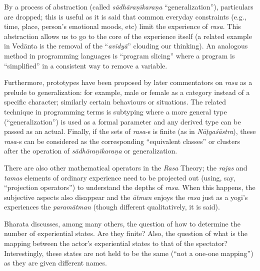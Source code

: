 By a process of abstraction (called \textsl{sādhāraṇīkaraṇa} “generalization”), particulars are dropped; this is useful as it is said that common everyday constraints (e.g., time, place, person’s emotional moods, etc) limit the experience of \textsl{rasa}. This abstraction allows us to go to the core of the experience itself (a related example in Vedānta is the removal of the “\textsl{avidyā}” clouding our thinking). An analogous method in programming languages is “program slicing” where a program is “simplified” in a consistent way to remove a variable. 

Furthermore, prototypes have been proposed by later commentators on \textsl{rasa} as a prelude to generalization: for example, male or female as a category instead of a specific character; similarly certain behaviours or situations. The related technique in programming terms is subtyping where a more general type (“generalization”) is used as a formal parameter and any derived type can be passed as an actual. Finally, if the sets of \textsl{rasa}-s is finite (as in \textsl{Nāṭyaśāstra}), these \textsl{rasa}-s can be considered as the corresponding “equivalent classes” or clusters after the operation of \textsl{sādhāraṇīkaraṇa} or generalization. 

There are also other mathematical operators in the \textsl{Rasa} Theory; the \textsl{rajas} and \textsl{tamas} elements of ordinary experience need to be projected out (using, say, “projection operators”) to understand the depths of \textsl{rasa}. When this happens, the subjective aspects also disappear and the \textsl{ātman} enjoys the \textsl{rasa} just as a yogi’s experiences the \textsl{paramātman} (though different qualitatively, it is said).

Bharata discusses, among many others, the question of how to determine the number of experiential states. Are they finite? Also, the question of what is the mapping between the actor’s experiential states to that of the spectator? Interestingly, these states are not held to be the same (“not a one-one mapping”) as they are given different names.

